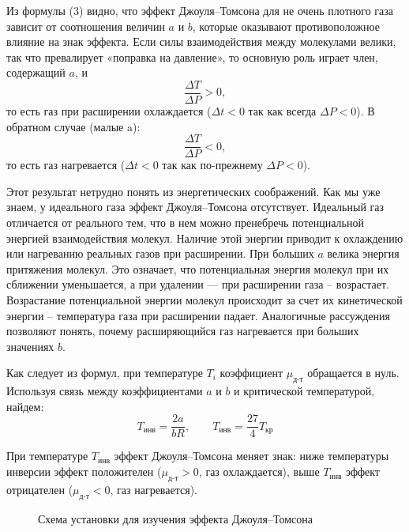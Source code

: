\documentclass[a4paper, 12pt]{article}
\begin{document}
	Из формулы (3) видно, что эффект Джоуля–Томсона для не очень плотного газа зависит от соотношения величин $a$ и $b$, которые оказывают противоположное влияние на знак эффекта. Если силы взаимодействия между молекулами велики, так что превалирует «поправка на давление», то основную роль играет член, содержащий $a$, и
	\[ \frac{\Delta T}{\Delta P} > 0, \]
	то есть газ при расширении охлаждается ($\Delta t < 0$ так как всегда
	$\Delta P < 0$). В обратном случае (малые a):
	\[ \frac{\Delta T}{\Delta P} < 0, \]
	то есть газ нагревается ($\Delta t < 0$ так как по-прежнему $\Delta P < 0$).
	
	Этот результат нетрудно понять из энергетических соображений. Как мы уже знаем, у идеального газа эффект Джоуля–Томсона отсутствует. Идеальный газ отличается от реального тем, что в нем можно пренебречь потенциальной энергией взаимодействия молекул. Наличие этой энергии приводит к охлаждению или нагреванию реальных газов при расширении. При больших $a$ велика энергия притяжения молекул. Это означает, что потенциальная энергия молекул при их сближении уменьшается, а при удалении — при расширении газа -- возрастает. Возрастание потенциальной энергии молекул происходит за счет их кинетической энергии -- температура газа при расширении падает. Аналогичные рассуждения позволяют понять, почему расширяющийся газ нагревается при больших значениях $b$.
	
	Как следует из формул, при температуре $T_i$ коэффициент $\mu_\text{д-т}$ обращается в нуль. Используя связь между коэффициентами $a$ и $b$ и критической температурой, найдем:
	\begin{equation}
		T_{инв}=\frac{2a}{bR}, \qquad
		T_{инв}=\frac{27}{4}T_{кр}
	\end{equation}
	
	При температуре $T_\text{инв}$ эффект Джоуля–Томсона меняет знак: ниже температуры инверсии эффект положителен ($\mu_\text{д-т} > 0$, газ охлаждается), выше $T_\text{инв}$ эффект отрицателен ($\mu_\text{д-т} < 0$, газ нагревается).	
	
	
	\begin{figure}[h!]
		\caption[]{\label{fig:1} Схема установки для изучения эффекта Джоуля–Томсона}
	\end{figure}
\end{document}
